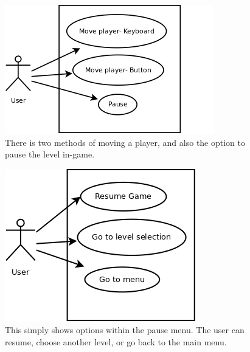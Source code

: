 \documentclass[a4paper]{article}
\begin{document}
   \begin{figure}[!ht]
   \centering
   \includegraphics[scale=0.9]{usecase4.png}
  \caption{There is two methods of moving a player, and also the option to pause
the level in-game.}
   \end{figure}
   \begin{figure}[!ht]
   \centering
   \includegraphics[scale=0.6]{usecase5.png}
  \caption{This simply shows options within the pause menu. The user can resume,
choose another level, or go back to the main menu.}
   \end{figure}
\clearpage
\end{document}
